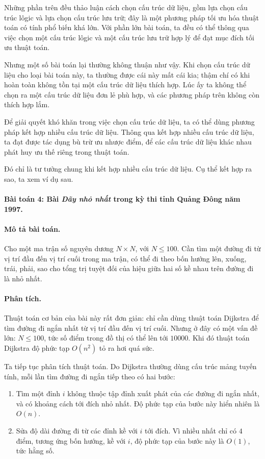 \documentclass[11pt]{article}
\begin{document}
Những phần trên đều thảo luận cách chọn cấu trúc dữ liệu, gồm lựa chọn cấu
trúc lôgic và lựa chọn cấu trúc lưu trữ; đây là một phương pháp tối ưu hóa
thuật toán có tính phổ biến khá lớn. Với phần lớn bài toán, ta đều có thể
thông qua việc chọn một cấu trúc lôgic và một cấu trúc lưu trữ hợp lý để đạt
mục đích tối ưu thuật toán.

Nhưng một số bài toán lại thường không thuận như vậy. Khi chọn cấu trúc dữ
liệu cho loại bài toán này, ta thường được cái này mất cái kia; thậm chí có
khi hoàn toàn không tồn tại một cấu trúc dữ liệu thích hợp. Lúc ấy ta không
thể chọn ra một cấu trúc dữ liệu đơn lẻ phù hợp, và các phương pháp trên
không còn thích hợp lắm.

Để giải quyết khó khăn trong việc chọn cấu trúc dữ liệu, ta có thể dùng
phương pháp kết hợp nhiều cấu trúc dữ liệu. Thông qua kết hợp nhiều cấu trúc
dữ liệu, ta đạt được tác dụng bù trừ ưu nhược điểm, để các cấu trúc dữ liệu
khác nhau phát huy ưu thế riêng trong thuật toán.

Đó chỉ là tư tưởng chung khi kết hợp nhiều cấu trúc dữ liệu. Cụ thể kết hợp
ra sao, ta xem ví dụ sau.

\paragraph{Bài toán 4: Bài \textit{Dãy nhỏ nhất} trong kỳ thi tỉnh Quảng Đông
năm 1997.}

\paragraph{Mô tả bài toán.}
Cho một ma trận số nguyên dương \(N\times N\), với \(N\le 100\). Cần tìm một
đường đi từ vị trí đầu đến vị trí cuối trong ma trận, có thể đi theo bốn
hướng lên, xuống, trái, phải, sao cho tổng trị tuyệt đối của hiệu giữa hai số
kề nhau trên đường đi là nhỏ nhất.

\paragraph{Phân tích.}
Thuật toán cơ bản của bài này rất đơn giản: chỉ cần dùng thuật toán Dijkstra
để tìm đường đi ngắn nhất từ vị trí đầu đến vị trí cuối. Nhưng ở đây có một
vấn đề lớn: \(N\le 100\), tức số điểm trong đồ thị có thể lên tới \(10000\).
Khi đó thuật toán Dijkstra độ phức tạp \(O(n^2)\) tỏ ra hơi quá sức.

Ta tiếp tục phân tích thuật toán. Do Dijkstra thường dùng cấu trúc mảng tuyến
tính, mỗi lần tìm đường đi ngắn tiếp theo có hai bước:
\begin{enumerate}
  \item Tìm một đỉnh \(i\) không thuộc tập đỉnh xuất phát của các đường đi
  ngắn nhất, và có khoảng cách tới đích nhỏ nhất. Độ phức tạp của bước này
  hiển nhiên là \(O(n)\).
  \item Sửa độ dài đường đi từ các đỉnh kề với \(i\) tới đích. Vì nhiều nhất
  chỉ có \(4\) điểm, tương ứng bốn hướng, kề với \(i\), độ phức tạp của bước
  này là \(O(1)\), tức hằng số.
\end{enumerate}
\end{document}
